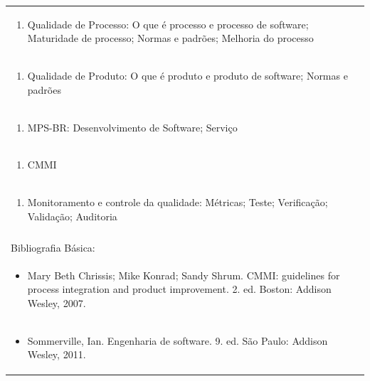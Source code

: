 \documentclass[11pt]{article}
\begin{document}
\begin{center}
\begin{longtable}{|p{4cm}|p{4cm}|p{4cm}|p{4cm}|}
\multicolumn{4}{|p{\dimexpr 16cm + 6\tabcolsep\relax}|}{\begin{enumerate}[start=2]\item Qualidade de Processo: O que é processo e processo de software; Maturidade de processo; Normas e padrões; Melhoria do processo\end{enumerate}}\\
\multicolumn{4}{|p{\dimexpr 16cm + 6\tabcolsep\relax}|}{\begin{enumerate}[start=3]\item Qualidade de Produto: O que é produto e produto de software; Normas e padrões\end{enumerate}}\\
\multicolumn{4}{|p{\dimexpr 16cm + 6\tabcolsep\relax}|}{\begin{enumerate}[start=4]\item MPS-BR: Desenvolvimento de Software; Serviço\end{enumerate}}\\
\multicolumn{4}{|p{\dimexpr 16cm + 6\tabcolsep\relax}|}{\begin{enumerate}[start=5]\item CMMI\end{enumerate}}\\
\multicolumn{4}{|p{\dimexpr 16cm + 6\tabcolsep\relax}|}{\begin{enumerate}[start=6]\item Monitoramento e controle da qualidade: Métricas; Teste; Verificação; Validação; Auditoria\end{enumerate}}\\
\multicolumn{4}{|p{\dimexpr 16cm + 6\tabcolsep\relax}|}{}\\
\hline
\multicolumn{4}{|p{16cm}|}{Bibliografia Básica:}\\*
\multicolumn{4}{|p{\dimexpr 16cm + 6\tabcolsep\relax}|}{\begin{itemize}\item Mary Beth Chrissis; Mike Konrad; Sandy Shrum. CMMI: guidelines for process integration and product improvement. 2. ed. Boston: Addison Wesley, 2007.\end{itemize}}\\
\multicolumn{4}{|p{\dimexpr 16cm + 6\tabcolsep\relax}|}{\begin{itemize}\item Sommerville, Ian. Engenharia de software. 9. ed. São Paulo: Addison Wesley, 2011.\end{itemize}}\\

\end{longtable}
\end{center}
\end{document}
